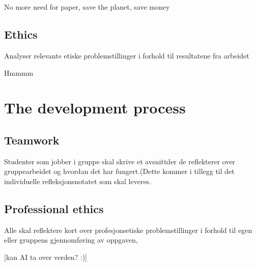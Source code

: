 \section{}



No more need for paper, save the planet, save money


\subsection{Ethics}
Analyser relevante etiske problemstillinger i forhold til resultatene fra arbeidet

Hmmmm

\section{The development process}
\subsection{Teamwork}
Studenter som jobber i gruppe skal skrive et avsnittder de reflekterer over gruppearbeidet og hvordan det har fungert.(Dette kommer i tillegg til det individuelle refleksjonsnotatet som skal leveres.

\subsection{Professional ethics}
Alle skal reflektere kort over profesjonsetiske problemstillinger i forhold til egen eller gruppens gjennomføring av oppgaven,

[kan AI ta over verden? :)]